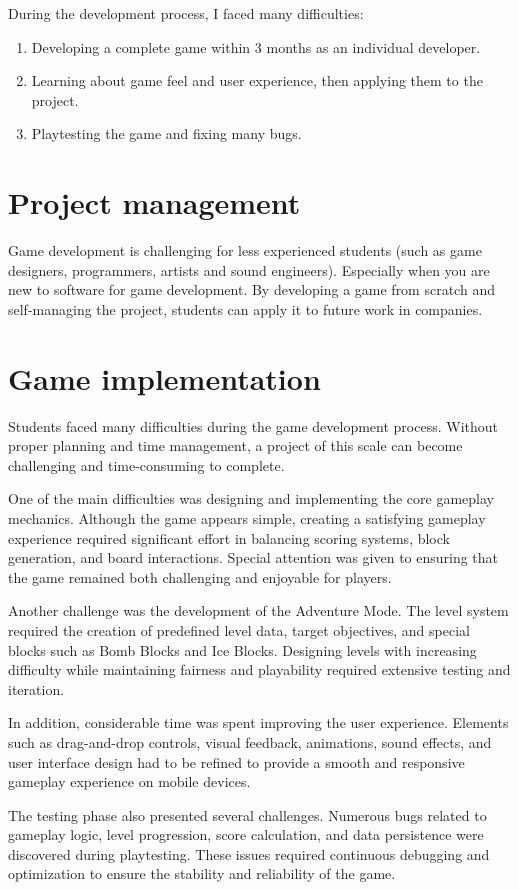 \documentclass[a4paper,12pt]{report}
\begin{document}
During the development process, I faced many difficulties:

\begin{enumerate}
    \item Developing a complete game within 3 months as an individual developer.
    \item Learning about game feel and user experience, then applying them to the project.
    \item Playtesting the game and fixing many bugs.
\end{enumerate}
\section{Project management}
Game development is challenging for less experienced students (such as game designers, programmers, artists and sound engineers). Especially when you are new to software for game development. By developing a game from scratch and self-managing the project, students can apply it to future work in companies.
\section{Game implementation}
Students faced many difficulties during the game development process. Without proper planning and time management, a project of this scale can become challenging and time-consuming to complete.

One of the main difficulties was designing and implementing the core gameplay mechanics. Although the game appears simple, creating a satisfying gameplay experience required significant effort in balancing scoring systems, block generation, and board interactions. Special attention was given to ensuring that the game remained both challenging and enjoyable for players.

Another challenge was the development of the Adventure Mode. The level system required the creation of predefined level data, target objectives, and special blocks such as Bomb Blocks and Ice Blocks. Designing levels with increasing difficulty while maintaining fairness and playability required extensive testing and iteration.

In addition, considerable time was spent improving the user experience. Elements such as drag-and-drop controls, visual feedback, animations, sound effects, and user interface design had to be refined to provide a smooth and responsive gameplay experience on mobile devices.

The testing phase also presented several challenges. Numerous bugs related to gameplay logic, level progression, score calculation, and data persistence were discovered during playtesting. These issues required continuous debugging and optimization to ensure the stability and reliability of the game.
\end{document}
